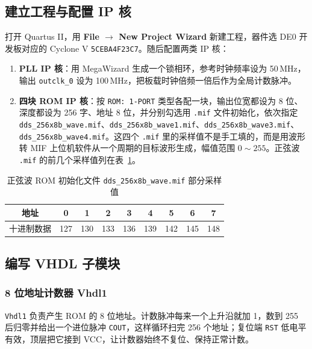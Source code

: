 \documentclass{ctexrep}
\begin{document}
\subsection{建立工程与配置 IP 核}

打开 Quartus II，用 \textbf{File $\rightarrow$ New Project Wizard} 新建工程，器件选 DE0 开发板对应的 Cyclone V \texttt{5CEBA4F23C7}。随后配置两类 IP 核：

\begin{enumerate}
    \item \textbf{PLL IP 核}：用 MegaWizard 生成一个锁相环，参考时钟频率设为 50\,MHz，输出 \texttt{outclk\_0} 设为 100\,MHz，把板载时钟倍频一倍后作为全局计数脉冲。
    \item \textbf{四块 ROM IP 核}：按 \texttt{ROM: 1-PORT} 类型各配一块，输出位宽都设为 8 位、深度都设为 256 字、地址 8 位，并分别勾选用 \texttt{.mif} 文件初始化，依次指定 \texttt{dds\_256x8b\_wave.mif}、\texttt{dds\_256x8b\_wave1.mif}、\texttt{dds\_256x8b\_wave3.mif}、\texttt{dds\_256x8b\_wave4.mif}。这四个 \texttt{.mif} 里的采样值不是手工填的，而是用波形转 MIF 上位机软件从一个周期的目标波形生成，幅值范围 $0\sim255$。正弦波 \texttt{.mif} 的前几个采样值列在表~\ref{e6:tab:sinmif}。
\end{enumerate}

\begin{table}[H]
    \centering
    \caption{正弦波 ROM 初始化文件 \texttt{dds\_256x8b\_wave.mif} 部分采样值}
    \label{e6:tab:sinmif}
    \begin{tabular}{ccccccccc}
        \toprule
        地址 & 0 & 1 & 2 & 3 & 4 & 5 & 6 & 7 \\
        \midrule
        十进制数据 & 127 & 130 & 133 & 136 & 139 & 142 & 145 & 148 \\
        \bottomrule
    \end{tabular}
\end{table}

\subsection{编写 VHDL 子模块}

\subsubsection{8 位地址计数器 Vhdl1}

\texttt{Vhdl1} 负责产生 ROM 的 8 位地址。计数脉冲每来一个上升沿就加 1，数到 255 后归零并给出一个进位脉冲 \texttt{COUT}，这样循环扫完 256 个地址；复位端 \texttt{RST} 低电平有效，顶层把它接到 VCC，让计数器始终不复位、保持正常计数。
\end{document}
